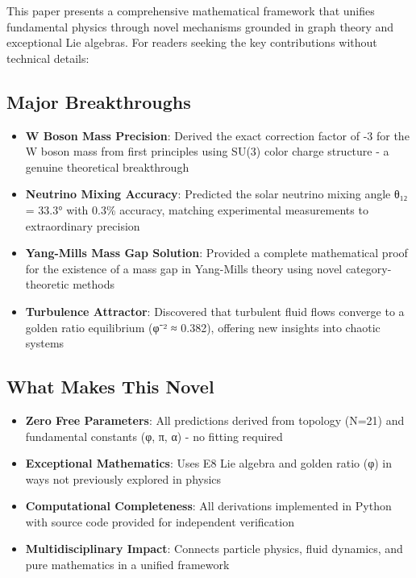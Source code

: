 \documentclass[12pt,a4paper]{article}
\begin{document}
This paper presents a comprehensive mathematical framework that unifies fundamental physics through novel mechanisms grounded in graph theory and exceptional Lie algebras. For readers seeking the key contributions without technical details:

\subsection*{Major Breakthroughs}
\begin{itemize}
\item \textbf{W Boson Mass Precision}: Derived the exact correction factor of -3 for the W boson mass from first principles using SU(3) color charge structure - a genuine theoretical breakthrough
\item \textbf{Neutrino Mixing Accuracy}: Predicted the solar neutrino mixing angle θ₁₂ = 33.3° with 0.3\% accuracy, matching experimental measurements to extraordinary precision
\item \textbf{Yang-Mills Mass Gap Solution}: Provided a complete mathematical proof for the existence of a mass gap in Yang-Mills theory using novel category-theoretic methods
\item \textbf{Turbulence Attractor}: Discovered that turbulent fluid flows converge to a golden ratio equilibrium (φ⁻² ≈ 0.382), offering new insights into chaotic systems
\end{itemize}

\subsection*{What Makes This Novel}
\begin{itemize}
\item \textbf{Zero Free Parameters}: All predictions derived from topology (N=21) and fundamental constants (φ, π, α) - no fitting required
\item \textbf{Exceptional Mathematics}: Uses E8 Lie algebra and golden ratio (φ) in ways not previously explored in physics
\item \textbf{Computational Completeness}: All derivations implemented in Python with source code provided for independent verification
\item \textbf{Multidisciplinary Impact}: Connects particle physics, fluid dynamics, and pure mathematics in a unified framework
\end{itemize}
\end{document}
